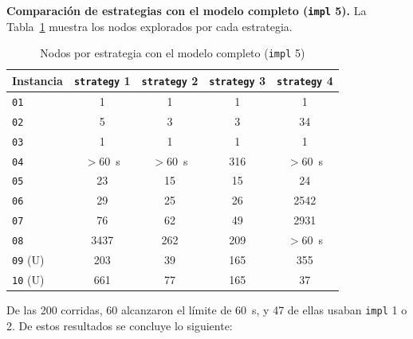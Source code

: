 \textbf{Comparación de estrategias con el modelo completo (\texttt{impl} 5).} La Tabla~\ref{tab:rect-estrategias-nodos} muestra los nodos explorados por cada estrategia.

\begin{table}[htbp]
    \caption{Nodos por estrategia con el modelo completo (\texttt{impl} 5)}
    \label{tab:rect-estrategias-nodos}
    \begin{tabular}{@{}lcccc@{}}
        \toprule
        Instancia        & \texttt{strategy} 1 & \texttt{strategy} 2 & \texttt{strategy} 3 & \texttt{strategy} 4 \\
        \midrule
        \texttt{01}      & 1                   & 1                   & 1                   & 1                   \\
        \texttt{02}      & 5                   & 3                   & 3                   & 34                  \\
        \texttt{03}      & 1                   & 1                   & 1                   & 1                   \\
        \texttt{04}      & $>60$~s             & $>60$~s             & 316                 & $>60$~s             \\
        \texttt{05}      & 23                  & 15                  & 15                  & 24                  \\
        \texttt{06}      & 29                  & 25                  & 26                  & 2542                \\
        \texttt{07}      & 76                  & 62                  & 49                  & 2931                \\
        \texttt{08}      & 3437                & 262                 & 209                 & $>60$~s             \\
        \texttt{09} (U)  & 203                 & 39                  & 165                 & 355                 \\
        \texttt{10} (U)  & 661                 & 77                  & 165                 & 37                  \\
        \bottomrule
    \end{tabular}
\end{table}

De las 200 corridas, 60 alcanzaron el límite de 60~s, y 47 de ellas usaban \texttt{impl} 1 o 2. De estos resultados se concluye lo siguiente:

